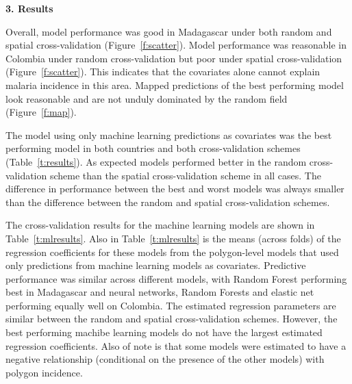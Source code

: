 \documentclass[11pt]{article}
\begin{document}
{\bf 3. Results}

Overall, model performance was good in Madagascar under both random and spatial cross-validation (Figure~\ref{f:scatter}).
Model performance was reasonable in Colombia under random cross-validation but poor under spatial cross-validation (Figure~\ref{f:scatter}).
This indicates that the covariates alone cannot explain malaria incidence in this area.
Mapped predictions of the best performing model look reasonable and are not unduly dominated by the random field (Figure~\ref{f:map}).

The model using only machine learning predictions as covariates was the best performing model in both countries and both cross-validation schemes (Table~\ref{t:results}).
As expected models performed better in the random cross-validation scheme than the spatial cross-validation scheme in all cases.
The difference in performance between the best and worst models was always smaller than the difference between the random and spatial cross-validation schemes.

The cross-validation results for the machine learning models are shown in Table~\ref{t:mlresults}.
Also in Table~\ref{t:mlresults} is the means (across folds) of the  regression coefficients for these models from the polygon-level models that used only predictions from machine learning models as covariates.
Predictive performance was similar across different models, with Random Forest performing best in Madagascar and neural networks, Random Forests and elastic net performing equally well on Colombia.
The estimated regression parameters are similar between the random and spatial cross-validation schemes.
However, the best performing machibe learning models do not have the largest estimated regression coefficients.
Also of note is that some models were estimated to have a negative relationship (conditional on the presence of the other models) with polygon incidence.

%
\end{document}
